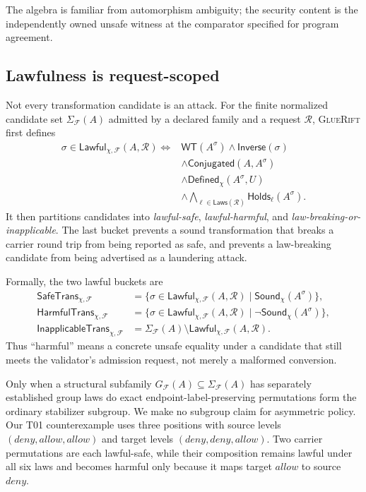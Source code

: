 \documentclass[sigconf,anonymous,review]{acmart}
\newcommand{\sys}{\textsc{GlueRift}\xspace}
\newcommand{\sound}{\mathsf{Sound}}
\newcommand{\defined}{\mathsf{Defined}}
\newcommand{\lawful}{\mathsf{Lawful}}
\begin{document}
The algebra is familiar from automorphism ambiguity; the security
content is the independently owned unsafe witness at the comparator
specified for program agreement.

\subsection{Lawfulness is request-scoped}

Not every transformation candidate is an attack.  For the finite normalized
candidate set $\Sigma_{\mathcal F}(A)$ admitted by a declared family and a
request $\mathcal R$, \sys first defines
\begin{align*}
\sigma\in\lawful_{\chi,\mathcal F}(A,\mathcal R)\iff {}&
\mathsf{WT}(A^\sigma)\land\mathsf{Inverse}(\sigma)\\
&\land\mathsf{Conjugated}(A,A^\sigma)\\
&\land\defined_\chi(A^\sigma,U)\\
&\land\bigwedge_{\ell\in\mathsf{Laws}(\mathcal R)}
  \mathsf{Holds}_\ell(A^\sigma).
\end{align*}
It then partitions candidates into \emph{lawful-safe},
\emph{lawful-harmful}, and \emph{law-breaking-or-inapplicable}.
The last bucket prevents a sound transformation that breaks a carrier
round trip from being reported as safe, and prevents a law-breaking
candidate from being advertised as a laundering attack.

Formally, the two lawful buckets are
\begin{align*}
\mathsf{SafeTrans}_{\chi,\mathcal F}
 &=\{\sigma\in\lawful_{\chi,\mathcal F}(A,\mathcal R)
     \mid\sound_\chi(A^\sigma)\},\\
\mathsf{HarmfulTrans}_{\chi,\mathcal F}
 &=\{\sigma\in\lawful_{\chi,\mathcal F}(A,\mathcal R)
     \mid\neg\sound_\chi(A^\sigma)\},\\
\mathsf{InapplicableTrans}_{\chi,\mathcal F}
 &=\Sigma_{\mathcal F}(A)\setminus
   \lawful_{\chi,\mathcal F}(A,\mathcal R).
\end{align*}
Thus ``harmful''
means a concrete unsafe equality under a candidate that still meets the
validator's admission request, not merely a malformed conversion.

Only when a structural subfamily $G_{\mathcal F}(A)\subseteq
\Sigma_{\mathcal F}(A)$ has separately established group laws do exact
endpoint-label-preserving permutations form the ordinary stabilizer subgroup.
We make no subgroup
claim for asymmetric policy.  Our T01 counterexample uses three
positions with source levels $(deny,allow,allow)$ and target levels
$(deny,deny,allow)$.  Two carrier permutations are each lawful-safe,
while their composition remains lawful under all six laws and becomes
harmful only because it maps target $allow$ to source $deny$.
\end{document}
